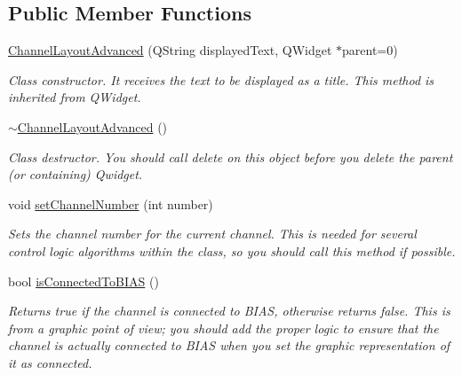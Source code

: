 \subsection*{Public Member Functions}
\begin{DoxyCompactItemize}
\item 
\hyperlink{classChannelLayoutAdvanced_a47fca52a45fbbd3584e6e3ee1f4fdcdb}{Channel\+Layout\+Advanced} (Q\+String displayed\+Text, Q\+Widget $\ast$parent=0)
\begin{DoxyCompactList}\small\item\em Class constructor. It receives the text to be displayed as a title. This method is inherited from Q\+Widget. \end{DoxyCompactList}\item 
\hypertarget{classChannelLayoutAdvanced_a81ecdc295cd9d4a097d76556442029be}{\hyperlink{classChannelLayoutAdvanced_a81ecdc295cd9d4a097d76556442029be}{$\sim$\+Channel\+Layout\+Advanced} ()}\label{classChannelLayoutAdvanced_a81ecdc295cd9d4a097d76556442029be}

\begin{DoxyCompactList}\small\item\em Class destructor. You should call delete on this object before you delete the parent (or containing) Qwidget. \end{DoxyCompactList}\item 
void \hyperlink{classChannelLayoutAdvanced_afa83505f555a87d3e0ebf4e7d7f1e407}{set\+Channel\+Number} (int number)
\begin{DoxyCompactList}\small\item\em Sets the channel number for the current channel. This is needed for several control logic algorithms within the class, so you should call this method if possible. \end{DoxyCompactList}\item 
bool \hyperlink{classChannelLayoutAdvanced_a9481d8caaf83aa07d440cf13941f1198}{is\+Connected\+To\+B\+I\+A\+S} ()
\begin{DoxyCompactList}\small\item\em Returns true if the channel is connected to B\+I\+A\+S, otherwise returns false. This is from a graphic point of view; you should add the proper logic to ensure that the channel is actually connected to B\+I\+A\+S when you set the graphic representation of it as connected. \end{DoxyCompactList}\end{DoxyCompactItemize}


